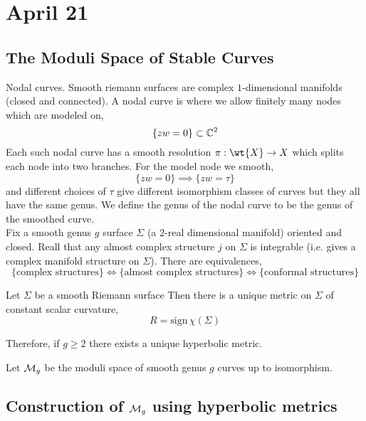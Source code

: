 \documentclass[12pt]{article}
\begin{document}
\renewcommand{\K}[2]{#1}
\renewcommand{\S}[3]{#1 #3{#2#3}}

\newcommand{\test}[2]{#1 {#2}}


\section{April 21}

\subsection{The Moduli Space of Stable Curves}

Nodal curves. Smooth riemann surfaces are complex $1$-dimensional manifolds (closed and connected). A nodal curve is where we allow finitely many nodes which are modeled on,
\[ \{ zw = 0 \} \subset \mathbb{C}^2 \]
Each such nodal curve has a smooth resolution $\pi : \wt{X} \to X$ which splits each node into two branches. For the model node we smooth,
\[ \{ zw = 0 \} \implies \{ zw = \tau \} \]
and different choices of $\tau$ give different isomorphism classes of curves but they all have the same genus. We define the genus of the nodal curve to be the genus of the smoothed curve. 
\bigskip\\
Fix a smooth genus $g$ surface $\Sigma$ (a $2$-real dimensional manifold) oriented and closed. Reall that any almost complex structure $j$ on $\Sigma$ is integrable (i.e. gives a complex manifold structure on $\Sigma$). There are equivalences,
\[ \{ \text{complex structures} \} \iff \{ \text{almost complex structures} \} \iff \{ \text{conformal structures} \} \]

\begin{thm}[Uniformization]
Let $\Sigma$ be a smooth Riemann surface Then there is a unique metric on $\Sigma$ of constant scalar curvature,
\[ R = \mathrm{sign} \, \chi(\Sigma) \]
\end{thm}

\begin{rmk}
Therefore, if $g \ge 2$ there exists a unique hyperbolic metric. 
\end{rmk}

\begin{defn}
Let $\mathcal{M}_g$ be the moduli space of smooth genus $g$ curves up to isomorphism. 
\end{defn}

\subsection{Construction of $\mathcal{M}_g$ using hyperbolic metrics}
\end{document}

